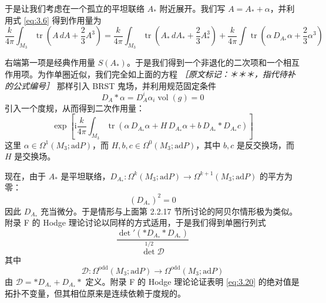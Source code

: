 于是让我们考虑在一个孤立的平坦联络 $A_{*}$ 附近展开。我们写 $A=A_{*}+\alpha$，并利用式 \eqref{eq:3.6} 得到作用量为
\begin{equation}
  \frac{k}{4\pi}\int_{M_3}\operatorname{tr}\left(A\,dA+\frac{2}{3}A^{3}\right)
  =\frac{k}{4\pi}\int_{M_3}\operatorname{tr}\left(A_{*}\,dA_{*}+\frac{2}{3}A_{*}^{3}\right)
  +\frac{k}{4\pi}\int\operatorname{tr}\left(\alpha\,D_{A_{*}}\alpha+\frac{2}{3}\alpha^{3}\right)
  \tag{3.16}
  \label{eq:3.16}
\end{equation}

右端第一项是经典作用量 $S(A_{*})$。于是我们得到一个非退化的二次项和一个相互作用项。为作单圈近似，我们完全如上面的方程 {\small\itshape ［原文标记：＊＊＊，指代待补的公式编号］} 那样引入 BRST 鬼场，并利用规范固定条件
\begin{equation}
  D_{A}*\alpha=D^{i}_{A}\alpha_{i}\operatorname{vol}(g)=0
  \tag{3.17}
  \label{eq:3.17}
\end{equation}
引入一个度规，从而得到二次作用量：
\begin{equation}
  \exp\left[\mathrm{i}\frac{k}{4\pi}\int_{M_3}\operatorname{tr}\left(\alpha\,D_{A_{*}}\alpha+H\,D_{A_{*}}\alpha+b\,D_{A_{*}}*D_{A_{*}}c\right)\right]
  \tag{3.18}
  \label{eq:3.18}
\end{equation}
这里 $\alpha\in\Omega^{1}(M_3;\mathrm{ad}P)$，而 $H,b,c\in\Omega^{0}(M_3;\mathrm{ad}P)$，其中 $b,c$ 是反交换场，而 $H$ 是交换场。

现在，由于 $A_{*}$ 是平坦联络，$D_{A_{*}}:\Omega^{k}(M_3;\mathrm{ad}P)\to\Omega^{k+1}(M_3;\mathrm{ad}P)$ 的平方为零：
\begin{equation}
  (D_{A_{*}})^{2}=0
  \tag{3.19}
  \label{eq:3.19}
\end{equation}
因此 $D_{A_{*}}$ 充当微分。于是情形与上面第 2.2.17 节所讨论的阿贝尔情形极为类似。附录 F 的 Hodge 理论讨论以同样的方式适用，于是我们得到单圈行列式
\begin{equation}
  \frac{\det'(*D_{A_{*}}*D_{A_{*}})}{\det^{1/2}\mathcal{D}}
  \tag{3.20}
  \label{eq:3.20}
\end{equation}
其中
\begin{equation}
  \mathcal{D}:\Omega^{\mathrm{odd}}(M_3;\mathrm{ad}P)\to\Omega^{\mathrm{odd}}(M_3;\mathrm{ad}P)
  \tag{3.21}
  \label{eq:3.21}
\end{equation}
由 $\mathcal{D}=*D_{A_{*}}+D_{A_{*}}*$ 定义。附录 F 的 Hodge 理论论证表明 \eqref{eq:3.20} 的绝对值是拓扑不变量，但其相位原来是连续依赖于度规的。

